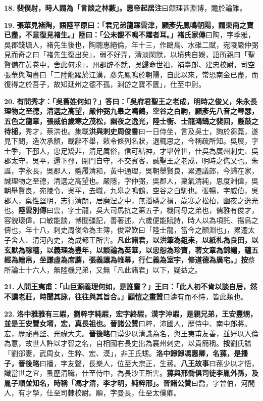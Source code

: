 \textbf{18.} \textbf{裴僕射，時人謂為「言談之林藪」。}{\footnotesize \textbf{惠帝起居注}曰頠理甚淵博，贍於論難。}

\textbf{19.} \textbf{張華見褚陶，語陸平原曰：「君兄弟龍躍雲津，顧彥先鳳鳴朝陽，謂東南之寶已盡，不意復見褚生。」陸曰：「公未覩不鳴不躍者耳。」}{\footnotesize \textbf{褚氏家傳}曰陶，字季雅，吳郡錢塘人，褚先生後也，陶聰惠絕倫，年十三，作鷗鳥、水碓二賦，宛陵嚴仲弼見而奇之曰「褚先生復出矣」，弱不好弄，清淡閑默，以墳典自娛，語所親曰「聖賢備在黃卷中，舍此何求」，州郡辟不就，吳歸命世祖，補臺郎、建忠校尉，司空張華與陶書曰「二陸龍躍於江漢，彥先鳳鳴於朝陽，自此以來，常恐南金已盡，而復得之於吾子，故知延州之德不孤，淵岱之寶不匱」，仕至中尉。}

\textbf{20.} \textbf{有問秀才：「吳舊姓何如？」答曰：「吳府君聖王之老成，明時之俊乂，朱永長理物之至德，清選之高望，嚴仲弼九皋之鳴鶴，空谷之白駒，顧彥先八音之琴瑟，五色之龍章，張威伯歲寒之茂松，幽夜之逸光，陸士衡、士龍鴻鵠之裴回，懸鼓之待槌，}{\footnotesize 秀才，蔡洪也。集載\textbf{洪與刺史周俊書}曰一日侍坐，言及吳士，詢於芻蕘，遂見下問，造次承顏，載辭不舉，敕令條列名狀，退輒思之，今稱疏所知。吳展，字士季，下邳人，忠足矯非，清足厲俗，信可結神，才堪幹世，仕吳為廣州刺史、吳郡太守，吳平，還下邳，閉門自守，不交賓客，誠聖王之老成，明時之儁乂也。朱誕，字永長，吳郡人，體履清和，黃中通理，吳朝舉賢良，累遷議郎，今歸在家，誠理物之至德，清選之高望也。嚴隱，字仲弼，吳郡人，稟氣清純，思度淵偉，吳朝舉賢良，宛陵令，吳平，去職，九皋之鳴鶴，空谷之白駒也。張暢，字威伯，吳郡人，稟性堅明，志行清朗，居磨涅之中，無淄磷之損，歲寒之松柏，幽夜之逸光也。\textbf{陸雲別傳}曰雲，字士龍，吳大司馬抗之第五子，機同母之弟也，儒雅有俊才，容貌瓌偉，口敏能談，博聞彊記，善著述，六歲便能賦詩，時人以為項託、揚烏之儔也，年十八，刺史周俊命為主簿，俊常歎曰「陸士龍，當今之顏淵也」，累遷太子舍人、清河內史，為成都王所害。}\textbf{凡此諸君，以洪筆為鉏耒，以紙札為良田，以玄默為稼穡，以義理為豐年，以談論為英華，以忠恕為珍寶，著文章為錦繡，蘊五經為繒帛，坐謙虛為席薦，張義讓為帷幕，行仁義為室宇，修道德為廣宅。」}{\footnotesize \textbf{按}蔡所論士十六人，無陸機兄弟，又無「凡此諸君」以下，疑益之。}

\textbf{21.} \textbf{人問王夷甫：「山巨源義理何如，是誰輩？」王曰：「此人初不肯以談自居，然不讀老莊，時聞其詠，往往與其旨合。」}{\footnotesize \textbf{顧愷之畫贊}曰濤有而不恃，皆此類也。}

\textbf{22.} \textbf{洛中雅雅有三嘏，劉粹字純嘏，宏字終嘏，漠字沖嘏，是親兄弟，王安豐甥，並是王安豐女壻，宏，真長祖也。}{\footnotesize \textbf{晉諸公贊}曰粹，沛國人，歷侍中、南中郎將。宏，歷祕書監、光祿大夫。\textbf{晉後略}曰漠少以清識為名，與王夷甫友善，並好以人倫為意，故世人許以才智之名，自相國右長史出為襄州刺史，以貴簡稱。\textbf{按}劉氏譜「劉邠妻，武周女，生粹、宏、漠」，非王氏甥。}\textbf{洛中錚錚馮惠卿，名蓀，是播子，}{\footnotesize \textbf{晉後略}曰播，字友聲，長樂人，位至大宗正，生蓀。\textbf{八王故事}曰蓀少以才悟，識當世之宜，蚤歷清職，仕至侍中，為長沙王所害。}\textbf{蓀與邢喬俱司徒李胤外孫，及胤子順並知名，時稱「馮才清，李才明，純粹邢」。}{\footnotesize \textbf{晉諸公贊}曰喬，字曾伯，河間人，有才學，仕至司隸校尉。順，字曼長，仕至太僕卿。}


